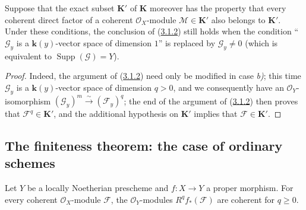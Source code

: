 \begin{corollary}[3.1.3]
\label{III.3.1.3}
Suppose that the exact subset $\boldsymbol{K}'$ of $\boldsymbol{K}$ moreover has the property
that every coherent direct factor of a coherent $\mathcal O_X$-module
$\mathcal M\in\boldsymbol{K}'$ also belongs to $\boldsymbol{K}'$. Under these conditions, the
conclusion of \textup{(\hyperref[III.3.1.2]{3.1.2})} still holds when the
condition ``$\mathcal G_y$ is a $\boldsymbol{k}(y)$-vector space of dimension $1$''
is replaced by $\mathcal G_y\neq0$ (which is equivalent to
$\operatorname{Supp}(\mathcal G)=Y$).
\end{corollary}

\begin{proof}
Indeed, the argument of (\hyperref[III.3.1.2]{3.1.2}) need only be
modified in case \textit{b)}; this time $\mathcal G_y$ is a $\boldsymbol{k}(y)$-vector space of
dimension $q>0$, and we consequently have an
$\mathcal O_Y$-isomorphism $(\mathcal G_y)^m\xrightarrow{\sim}(\mathcal F_y)^q$; the end
of the argument of (\hyperref[III.3.1.2]{3.1.2}) then proves that
$\mathcal F^q\in\boldsymbol{K}'$, and the additional hypothesis on $\boldsymbol{K}'$ implies that
$\mathcal F\in\boldsymbol{K}'$.
\end{proof}

\subsection{The finiteness theorem: the case of ordinary schemes}
\label{subsection:III.3.2}

\begin{theorem}[3.2.1]
\label{III.3.2.1}
Let $Y$ be a locally Noetherian prescheme and $f:X\to Y$ a proper
morphism. For every coherent $\mathcal O_X$-module $\mathcal F$, the
$\mathcal O_Y$-modules $R^qf_*(\mathcal F)$ are coherent for $q\geq0$.
\end{theorem}

